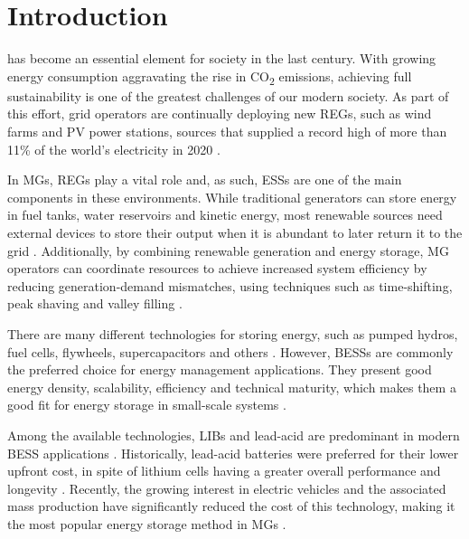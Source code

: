 \documentclass{ieeeaccess}
\begin{document}
    \titlepgskip=-15pt

    \maketitle

    \section{Introduction}
    \label{sec:introduction}
     has become an essential element for society in the last century. With growing energy consumption aggravating the rise in CO\textsubscript{2} emissions, achieving full sustainability is one of the greatest challenges of our modern society. As part of this effort, grid operators are continually deploying new \acp{REG}, such as wind farms and \ac{PV} power stations, sources that supplied a record high of more than 11\% of the world's electricity in 2020 \cite{EMBER2021}.

    In \acp{MG}, \acp{REG} play a vital role and, as such, \acp{ESS} are one of the main components in these environments. While traditional generators can store energy in fuel tanks, water reservoirs and kinetic energy, most renewable sources need external devices to store their output when it is abundant to later return it to the grid \cite{STECCA2020}. Additionally, by combining renewable generation and energy storage, \ac{MG} operators can coordinate resources to achieve increased system efficiency by reducing generation-demand mismatches, using techniques such as time-shifting, peak shaving and valley filling \cite{WANG20196201, LI2020106058, PARRA2015576, ZHANG2019772}.

    There are many different technologies for storing energy, such as pumped hydros, fuel cells, flywheels, supercapacitors and others \cite{IBRAHIM2008}. However, \acp{BESS} are commonly the preferred choice for energy management applications. They present good energy density, scalability, efficiency and technical maturity, which makes them a good fit for energy storage in small-scale systems \cite{KOCER2019, martins2018optimal, FU20136749070}.

    Among the available technologies, \acp{LIB} and lead-acid are predominant in modern \ac{BESS} applications \cite{FU20136749070, ALSAIDAN8094981}. Historically, lead-acid batteries were preferred for their lower upfront cost, in spite of lithium cells having a greater overall performance and longevity \cite{wang2013li, xu2010lithium}. Recently, the growing interest in electric vehicles and the associated mass production have significantly reduced the cost of this technology, making it the most popular energy storage method in \acp{MG} \cite{mongird20202020, BBERG2020, zhang2018energy}.
\end{document}
